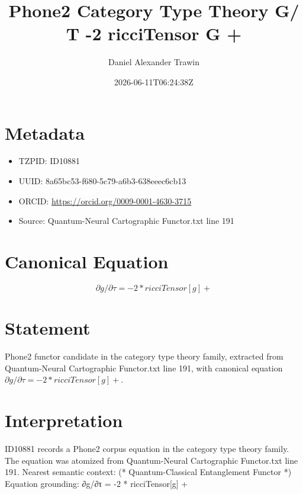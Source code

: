 \documentclass[11pt]{article}
\title{Phone2 Category Type Theory G/ Τ -2 ricciTensor G +}
\author{Daniel Alexander Trawin}
\date{2026-06-11T06:24:38Z}
\begin{document}
\maketitle
\section*{Metadata}
\begin{itemize}
\item TZPID: ID10881
\item UUID: 8a65bc53-f680-5c79-a6b3-638eeec6cb13
\item ORCID: \url{https://orcid.org/0009-0001-4630-3715}
\item Source: Quantum-Neural Cartographic Functor.txt line 191
\end{itemize}
\section*{Canonical Equation}
\[
∂g/∂τ = -2 * ricciTensor[g] +
\]
\section*{Statement}
Phone2 functor candidate in the category type theory family, extracted from Quantum-Neural Cartographic Functor.txt line 191, with canonical equation $∂g/∂τ = -2 * ricciTensor[g] +$.
\section*{Interpretation}
ID10881 records a Phone2 corpus equation in the category type theory family. The equation was atomized from Quantum-Neural Cartographic Functor.txt line 191. Nearest semantic context: (* Quantum-Classical Entanglement Functor *) Equation grounding: ∂g/∂τ = -2 * ricciTensor[g] +
\end{document}
